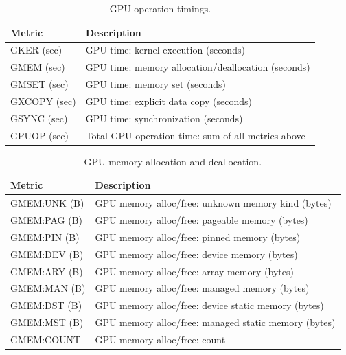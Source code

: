\begin{table}[t]
\centering
\begin{tabular}{|l|l|}\hline
Metric & Description\\\hline\hline
 GKER (sec)  &  GPU time: kernel execution (seconds)  \\\hline 
  GMEM (sec)  &  GPU time: memory allocation/deallocation (seconds)  \\\hline 
  GMSET (sec)  &  GPU time: memory set (seconds)  \\\hline 
  GXCOPY (sec)  &  GPU time: explicit data copy (seconds)  \\\hline 
  GSYNC (sec)  &  GPU time: synchronization (seconds)  \\\hline 
 GPUOP (sec) & Total GPU operation time: sum of all metrics above \\\hline
\end{tabular}
\caption{GPU operation timings.}
\label{table:gtimes}
\end{table}

\begin{table}[t]
\centering
\begin{tabular}{|l|l|}\hline
Metric & Description\\\hline\hline
 GMEM:UNK (B)  &  GPU memory alloc/free: unknown memory kind (bytes)  \\\hline
  GMEM:PAG (B)  &  GPU memory alloc/free: pageable memory (bytes)  \\\hline
  GMEM:PIN (B)  &  GPU memory alloc/free: pinned memory (bytes)  \\\hline
  GMEM:DEV (B)  &  GPU memory alloc/free: device memory (bytes)  \\\hline
  GMEM:ARY (B)  &  GPU memory alloc/free: array memory (bytes)  \\\hline
  GMEM:MAN (B)  &  GPU memory alloc/free: managed memory (bytes)  \\\hline
  GMEM:DST (B)  &  GPU memory alloc/free: device static memory (bytes)  \\\hline
  GMEM:MST (B)  &  GPU memory alloc/free: managed static memory (bytes)  \\\hline
  GMEM:COUNT  &  GPU memory alloc/free: count  \\\hline
\end{tabular}
\caption{GPU memory allocation and deallocation.}
\label{table:gmem}
\end{table}


